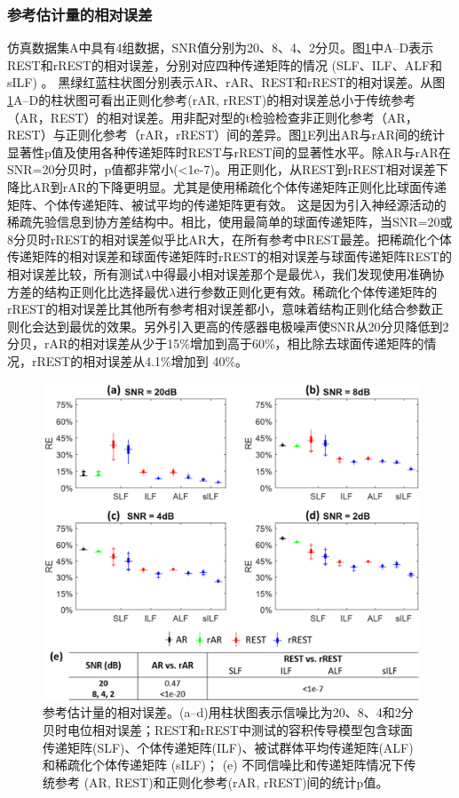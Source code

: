 \subsubsection{参考估计量的相对误差}
仿真数据集A中具有4组数据，SNR值分别为20、8、4、2分贝。图\ref{3.4}中A–D表示REST和rREST的相对误差，分别对应四种传递矩阵的情况 (SLF、ILF、ALF和sILF) 。 黑绿红蓝柱状图分别表示AR、rAR、REST和rREST的相对误差。从图\ref{3.4}A–D的柱状图可看出正则化参考(rAR, rREST)的相对误差总小于传统参考（AR，REST）的相对误差。用非配对型的t检验检查非正则化参考（AR，REST）与正则化参考（rAR，rREST）间的差异。图\ref{3.4}E列出AR与rAR间的统计显著性p值及使用各种传递矩阵时REST与rREST间的显著性水平。除AR与rAR在SNR=20分贝时，p值都非常小(<1e-7)。用正则化，从REST到rREST相对误差下降比AR到rAR的下降更明显。尤其是使用稀疏化个体传递矩阵正则化比球面传递矩阵、个体传递矩阵、被试平均的传递矩阵更有效。 这是因为引入神经源活动的稀疏先验信息到协方差结构中。相比，使用最简单的球面传递矩阵，当SNR=20或8分贝时rREST的相对误差似乎比AR大，在所有参考中REST最差。把稀疏化个体传递矩阵的相对误差和球面传递矩阵时rREST的相对误差与球面传递矩阵REST的相对误差比较，所有测试$\lambda$中得最小相对误差那个是最优$\lambda$，我们发现使用准确协方差的结构正则化比选择最优$\lambda$进行参数正则化更有效。稀疏化个体传递矩阵的rREST的相对误差比其他所有参考相对误差都小，意味着结构正则化结合参数正则化会达到最优的效果。另外引入更高的传感器电极噪声使SNR从20分贝降低到2分贝，rAR的相对误差从少于15\%增加到高于60\%，相比除去球面传递矩阵的情况，rREST的相对误差从4.1\%增加到
40\%。
\begin{figure}[!h]
	\includegraphics[width=15cm]{pic/Frontier/figure4.png}
	\caption{参考估计量的相对误差。(a–d)用柱状图表示信噪比为20、8、4和2分贝时电位相对误差；REST和rREST中测试的容积传导模型包含球面
	传递矩阵(SLF)、个体传递矩阵(ILF)、被试群体平均传递矩阵(ALF)和稀疏化个体传递矩阵 (sILF)； (e) 不同信噪比和传递矩阵情况下传统参考
	(AR, REST)和正则化参考(rAR, rREST)间的统计p值。}
	\label{3.4}
\end{figure}
